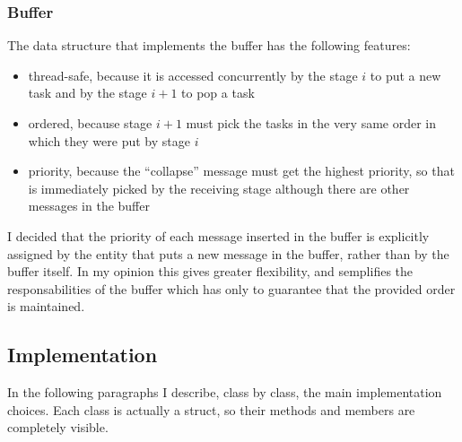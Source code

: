 \documentclass[12pt]{article}
\begin{document}
\subsubsection{Buffer}
The data structure that implements the buffer has the following features:
\begin{itemize}
\item thread-safe, because it is accessed concurrently by the stage $i$ to put a new task and by the stage $i+1$ to pop a task 
\item ordered, because stage $i+1$ must pick the tasks in the very same order in which they were put by stage $i$
\item priority, because the ``collapse'' message must get the highest priority, so that is immediately picked by the receiving stage although there are other messages in the buffer
\end{itemize}
I decided that the priority of each message inserted in the buffer is explicitly assigned by the entity that puts a new message in the buffer, rather than by the buffer itself. In my opinion this gives greater flexibility, and semplifies the responsabilities of the buffer which has only to guarantee that the provided order is maintained.

\subsection{Implementation}
In the following paragraphs I describe, class by class, the main implementation choices. Each class is actually a struct, so their methods and members are completely visible.
\end{document}
